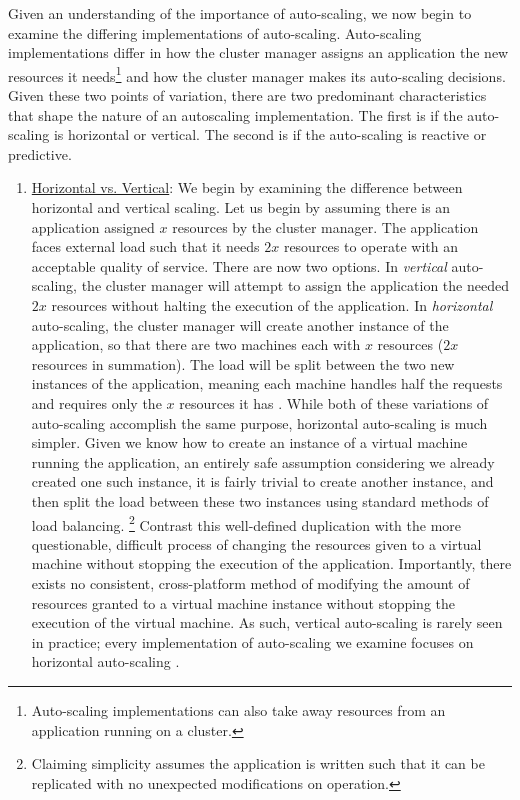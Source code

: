 Given an understanding of the importance of auto-scaling, we now begin to
examine the differing implementations of auto-scaling. Auto-scaling
implementations differ in how the cluster manager
assigns an application the new resources it
needs\footnote{Auto-scaling implementations can also take away resources from
an application running on a cluster.} and how the cluster manager makes its
auto-scaling decisions. Given these two points of
variation, there are two predominant characteristics that shape the nature of an autoscaling
implementation. The first is if the auto-scaling is horizontal or vertical. The
second is if the auto-scaling is reactive or predictive.

\begin{enumerate}
  \item \underline{Horizontal vs. Vertical}: We begin by examining
    the difference between horizontal and vertical scaling.
    Let us begin by assuming there is an application assigned $x$ resources by the
    cluster manager. The application
    faces external load such that it needs $2x$ resources to operate with an
    acceptable quality of service. There are now two options. In
    \textit{vertical} auto-scaling, the cluster manager will attempt to assign
    the application the needed $2x$ resources
    without halting the execution of the application. In \textit{horizontal}
    auto-scaling, the cluster manager will create another instance of
    the application, so that there are two machines each with
    $x$ resources ($2x$ resources in summation). The load will be split between
    the two new instances of the application, meaning each machine handles half
    the requests and requires only the $x$ resources it has
    \cite{auto-scaling-techniques-for-elastic-applications-in-cloud-environments}. While
    both of these variations of auto-scaling accomplish the same purpose, horizontal
    auto-scaling is much simpler. Given we know how to create an instance of a
    virtual machine running the application, an entirely safe assumption
    considering we already created one such instance, it is fairly trivial to create
    another instance, and then split the load between these two instances using
    standard methods of load balancing. \footnote{Claiming
    simplicity assumes the application is written
    such that it can be replicated with no unexpected modifications
    on operation.} Contrast this well-defined duplication with the more questionable, difficult
    process of changing the resources given to a virtual machine without stopping
    the execution of the application. Importantly, there exists
    no consistent, cross-platform method of
    modifying the amount of resources granted to a virtual machine instance without
    stopping the execution of the virtual machine. As such, vertical auto-scaling is
    rarely seen in practice; every implementation of
    auto-scaling we examine focuses on horizontal auto-scaling
    \cite{auto-scaling-techniques-for-elastic-applications-in-cloud-environments}.


\end{enumerate}
